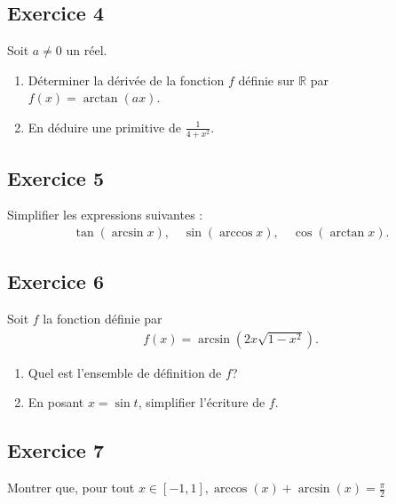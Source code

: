 \documentclass[letterpaper,10pt,french]{jupyterBook}
\begin{document}
\subsection{Exercice 4}
\label{\detokenize{exo5:exercice-4}}
\sphinxAtStartPar
Soit \(a\neq 0\) un réel.
\begin{enumerate}
%
\item {} 
\sphinxAtStartPar
Déterminer la dérivée de la fonction \(f\) définie sur \(\mathbb{R}\) par \(f(x)=\arctan(ax)\).

\item {} 
\sphinxAtStartPar
En déduire une primitive de \(\frac{1}{4+x^2}\).

\end{enumerate}


\subsection{Exercice 5}
\label{\detokenize{exo5:exercice-5}}
\sphinxAtStartPar
Simplifier les expressions suivantes :
\begin{equation*}
\begin{split}
\tan(\arcsin x),\quad \sin(\arccos x),\quad \cos(\arctan x).
\end{split}
\end{equation*}

\subsection{Exercice 6}
\label{\detokenize{exo5:exercice-6}}
\sphinxAtStartPar
Soit \(f\) la fonction définie par
\begin{equation*}
\begin{split}
f(x)=\arcsin\left(2x\sqrt{1-x^2}\right).
\end{split}
\end{equation*}\begin{enumerate}
%
\item {} 
\sphinxAtStartPar
Quel est l’ensemble de définition de \(f\)?

\item {} 
\sphinxAtStartPar
En posant \(x=\sin t\), simplifier l’écriture de \(f\).

\end{enumerate}


\subsection{Exercice 7}
\label{\detokenize{exo5:exercice-7}}
\sphinxAtStartPar
Montrer que, pour tout \(x\in[-1,1], \arccos(x)+\arcsin(x)=\frac\pi2\)
\end{document}
